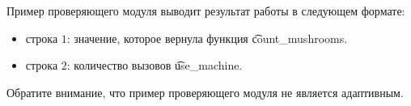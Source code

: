 Пример проверяющего модуля выводит результат работы в следующем формате:
\begin{itemize}
\item строка $1$: значение, которое вернула функция \t{count\_mushrooms}.
\item строка $2$: количество вызовов \t{use\_machine}.
\end{itemize}

Обратите внимание, что пример проверяющего модуля не является адаптивным.
